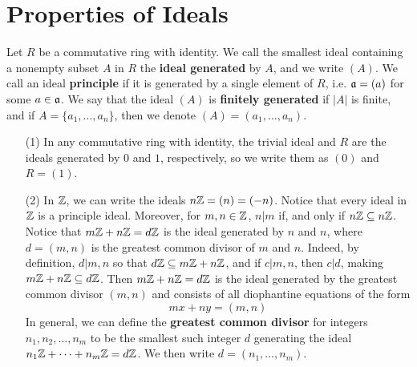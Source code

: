 \section{Properties of Ideals}

\begin{definition}
    Let $R$ be a commutative ring with identity. We call the smallest ideal
    containing a nonempty subset $A$ in $R$ the  \textbf{ideal generated} by
    $A$, and we write $(A)$. We call an ideal \textbf{principle} if it is
    generated by a single element of $R$, i.e. $\mathfrak{a}=(a)$ for some $a \in \mathfrak{a}$. We
    say that the ideal $(A)$ is \textbf{finitely generated} if $|A|$ is finite,
    and if  $A=\{a_1, \dots, a_n\}$, then we denote $(A)=(a_1, \dots, a_n)$.
\end{definition}

\begin{example}\label{1.13}
    \begin{enumerate}
        \item[(1)] In any commutative ring with identity, the trivial ideal and
            $R$ are the ideals generated by $0$ and $1$, respectively, so we
            write them as $(0)$ and $R=(1)$.

        \item[(2)] In $\mathbb{Z}$, we can write the ideals  $n\mathbb{Z}=(n)=(-n)$. Notice that
            every ideal in $\mathbb{Z}$ is a principle ideal. Moreover, for $m,n \in
            \mathbb{Z}$, $n|m$ if, and only if  $n\mathbb{Z} \subseteq n\mathbb{Z}$. Notice that
            $m\mathbb{Z}+n\mathbb{Z}=d\mathbb{Z}$ is the ideal generated by $n$ and $n$, where $d=(m,n)$
            is the greatest common divisor of $m$ and  $n$. Indeed, by
            definition, $d|m,n$ so that $d\mathbb{Z} \subseteq m\mathbb{Z}+n\mathbb{Z}$, and if
            $c|m,n$, then  $c|d$, making  $m\mathbb{Z}+n\mathbb{Z} \subseteq d\mathbb{Z}$. Then
            $m\mathbb{Z}+n\mathbb{Z}=d\mathbb{Z}$ is the ideal generated by the greatest common divisor
             $(m,n)$ and consists of all diophantine equations of the form
             \begin{equation*}
                 mx+ny=(m,n)
             \end{equation*}
             In general, we can define the \textbf{greatest common divisor} for
             integers $n_1, n_2, \dots, n_m$ to be the smallest such integer $d$
             generating the ideal $n_1\mathbb{Z}+\dots+n_m\mathbb{Z}=d\mathbb{Z}$. We then write
             $d=(n_1, \dots, n_m)$.


\end{enumerate}
\end{example}
